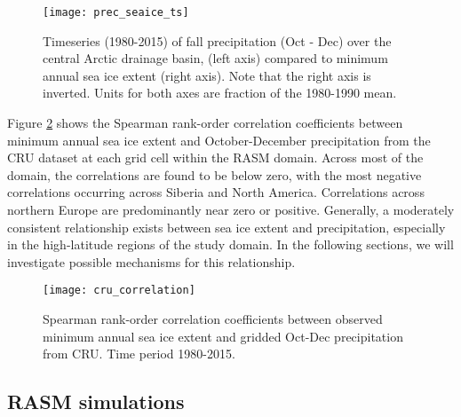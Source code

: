 \begin{figure}
  \centering
  \texttt{[image: prec\_seaice\_ts]}
  \caption{Timeseries (1980-2015) of fall precipitation (Oct - Dec) over the central Arctic drainage basin, (left axis) compared to minimum annual sea ice extent (right axis). Note that the right axis is inverted. Units for both axes are fraction of the 1980-1990 mean.}
  \label{fig:prec_ice_ts}
\end{figure}

Figure \ref{fig:prec_spatial_corr} shows the Spearman rank-order correlation coefficients between minimum annual sea ice extent and October-December precipitation from the CRU dataset at each grid cell within the RASM domain.
Across most of the domain, the correlations are found to be below zero, with the most negative correlations occurring across Siberia and North America.
Correlations across northern Europe are predominantly near zero or positive. %
Generally, a moderately consistent relationship exists between sea ice extent and precipitation, especially in the high-latitude regions of the study domain.
In the following sections, we will investigate possible mechanisms for this relationship.

\begin{figure}
  \centering
  \texttt{[image: cru\_correlation]}
  \caption{Spearman rank-order correlation coefficients between observed minimum annual sea ice extent and gridded Oct-Dec precipitation from CRU. Time period 1980-2015.}
  \label{fig:prec_spatial_corr}
\end{figure}

\subsection{RASM simulations}
\label{sec:rasm_results}



